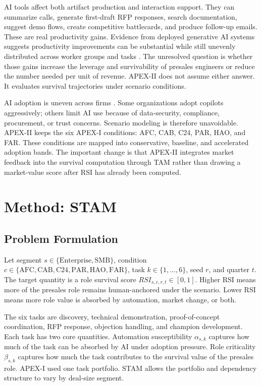 \documentclass[10pt,conference]{IEEEtran}
\begin{document}
AI tools affect both artifact production and interaction support. They can summarize calls, generate first-draft RFP responses, search documentation, suggest demo flows, create competitive battlecards, and produce follow-up emails. These are real productivity gains. Evidence from deployed generative AI systems suggests productivity improvements can be substantial while still unevenly distributed across worker groups and tasks \cite{brynjolfsson2023generative}. The unresolved question is whether those gains increase the leverage and survivability of presales engineers or reduce the number needed per unit of revenue. APEX-II does not assume either answer. It evaluates survival trajectories under scenario conditions.

AI adoption is uneven across firms \cite{mcelheran2024adoption}. Some organizations adopt copilots aggressively; others limit AI use because of data-security, compliance, procurement, or trust concerns. Scenario modeling is therefore unavoidable. APEX-II keeps the six APEX-I conditions: AFC, CAB, C24, PAR, HAO, and FAR. These conditions are mapped into conservative, baseline, and accelerated adoption bands. The important change is that APEX-II integrates market feedback into the survival computation through TAM rather than drawing a market-value score after RSI has already been computed.

\section{Method: STAM}
\subsection{Problem Formulation}
Let segment $s \in \{\mathrm{Enterprise}, \mathrm{SMB}\}$, condition $c \in \{\mathrm{AFC}, \mathrm{CAB}, \mathrm{C24}, \mathrm{PAR}, \mathrm{HAO}, \mathrm{FAR}\}$, task $k \in \{1,\ldots,6\}$, seed $r$, and quarter $t$. The target quantity is a role survival score $RSI_{s,c,r,t} \in [0,1]$. Higher RSI means more of the presales role remains human-anchored under the scenario. Lower RSI means more role value is absorbed by automation, market change, or both.

The six tasks are discovery, technical demonstration, proof-of-concept coordination, RFP response, objection handling, and champion development. Each task has two core quantities. Automation susceptibility $\alpha_{s,k}$ captures how much of the task can be absorbed by AI under adoption pressure. Role criticality $\beta_{s,k}$ captures how much the task contributes to the survival value of the presales role. APEX-I used one task portfolio. STAM allows the portfolio and dependency structure to vary by deal-size segment.
\end{document}
